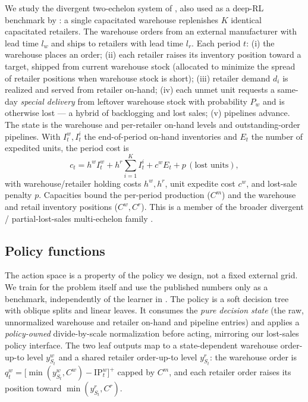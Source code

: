 \documentclass[11pt]{article}
\begin{document}
We study the divergent two-echelon system of \citet{vanroy1997ndp}, also used as a deep-RL
benchmark by \citet{gijsbrechts2022drl}: a single capacitated warehouse replenishes $K$ identical
capacitated retailers. The warehouse orders from an external manufacturer with lead time $l_w$ and
ships to retailers with lead time $l_r$. Each period $t$: (i) the warehouse places an order; (ii)
each retailer raises its inventory position toward a target, shipped from current warehouse stock
(allocated to minimize the spread of retailer positions when warehouse stock is short); (iii)
retailer demand $d_i$ is realized and served from retailer on-hand; (iv) each unmet unit requests a
same-day \emph{special delivery} from leftover warehouse stock with probability $P_w$ and is
otherwise lost --- a hybrid of backlogging and lost sales; (v) pipelines advance. The state is the
warehouse and per-retailer on-hand levels and outstanding-order pipelines. With $I^w_t,I^i_t$ the
end-of-period on-hand inventories and $E_t$ the number of expedited units, the period cost is
\[
c_t = h^w I^w_t + h^r \sum_{i=1}^{K} I^i_t + c^w E_t + p\,(\text{lost units}),
\]
with warehouse/retailer holding costs $h^w,h^r$, unit expedite cost $c^w$, and lost-sale penalty
$p$. Capacities bound the per-period production ($C^m$) and the warehouse and retail inventory
positions ($C^w,C^r$). This is a member of the broader divergent / partial-lost-sales multi-echelon
family \citep{nahmias1994partial, federgruen1984multilocation, dekok2018typology, kaynov2024owmr}.

\subsection{Policy functions}

The action space is a property of the policy we design, not a fixed external grid. We train for the
problem itself and use the published numbers only as a benchmark, independently of the learner in
\citet{gijsbrechts2022drl}. The policy is a soft decision tree with oblique splits and linear
leaves. It consumes the \emph{pure decision state} (the raw, unnormalized warehouse and retailer
on-hand and pipeline entries) and applies a \emph{policy-owned} divide-by-scale normalization before
acting, mirroring our lost-sales policy interface. The two leaf outputs map to a state-dependent
warehouse order-up-to level $y^w_{S_t}$ and a shared retailer order-up-to level $y^r_{S_t}$: the
warehouse order is $q^w_t = \big[\min(y^w_{S_t},C^w) - \mathrm{IP}^w_t\big]^+$ capped by $C^m$, and
each retailer order raises its position toward $\min(y^r_{S_t},C^r)$.
\end{document}
